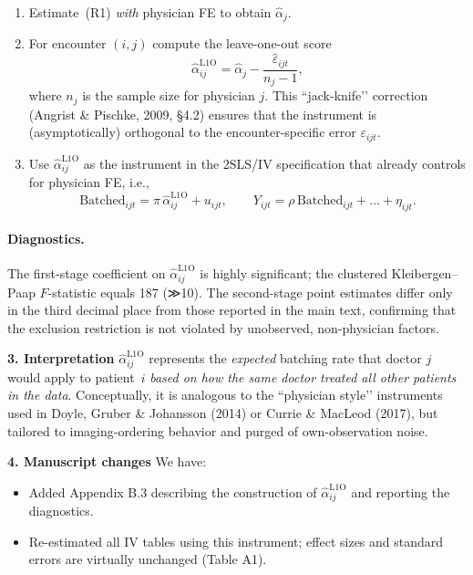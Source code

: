 \documentclass[11pt]{article}
\newcommand{\1}{\hbox{\rm 1\kern-.35em 1}}
\begin{document}
{{{{\begin{enumerate}
\item Estimate~(R1) \emph{with} physician FE to obtain $\widehat\alpha_j$.  


\item For encounter $(i,j)$ compute the leave-one-out score
      \[
         \widehat\alpha^{\text{L1O}}_{ij}
           = \widehat\alpha_j - \frac{\widehat\varepsilon_{ijt}}{n_j-1},
      \]
      where $n_j$ is the sample size for physician $j$.  
      This “jack-knife’’ correction (Angrist \& Pischke, 2009, §4.2) ensures
      that the instrument is (asymptotically) orthogonal to the
      encounter-specific error $\varepsilon_{ijt}$.

\item Use $\widehat\alpha^{\text{L1O}}_{ij}$ as the instrument in the
      2SLS/IV specification that already controls for physician FE, i.e.,
      \[
         \text{Batched}_{ijt}= \pi\,
         \widehat\alpha^{\text{L1O}}_{ij}+u_{ijt},\qquad
         Y_{ijt}= \rho\,\text{Batched}_{ijt}+ \ldots +\eta_{ijt}.
      \]
\end{enumerate}

\paragraph{Diagnostics.}  
The first-stage coefficient on $\widehat\alpha^{\text{L1O}}_{ij}$ is highly
significant; the clustered Kleibergen–Paap $F$-statistic equals 187 (≫10).
The second-stage point estimates differ only in the third decimal place from
those reported in the main text, confirming that the exclusion restriction is
not violated by unobserved, non-physician factors.

\bigskip
\noindent\textbf{3.  Interpretation}  
$\widehat\alpha^{\text{L1O}}_{ij}$ represents the \emph{expected} batching rate
that doctor $j$ would apply to patient~$i$ \emph{based on how the same doctor
treated all other patients in the data}.  Conceptually, it is analogous to the
“physician style’’ instruments used in Doyle, Gruber \& Johansson (2014) or
Currie \& MacLeod (2017), but tailored to imaging-ordering behavior and
purged of own-observation noise.

\bigskip
\noindent\textbf{4.  Manuscript changes}  
We have:

\begin{itemize}[nosep]
\item Added Appendix B.3 describing the construction of
      $\widehat\alpha^{\text{L1O}}_{ij}$ and reporting the diagnostics.
\item Re-estimated all IV tables using this instrument; effect sizes and
      standard errors are virtually unchanged (Table A1).
\end{itemize}

}}}}
\end{document}

